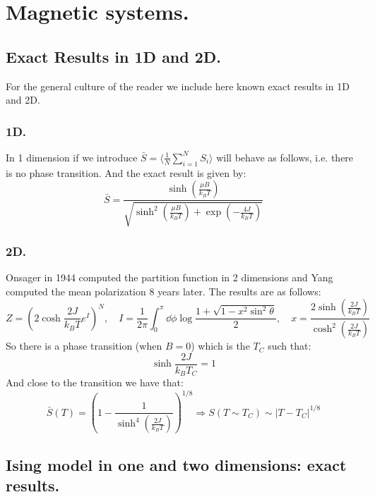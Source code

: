 \documentclass[10pt,a4paper]{book}
\begin{document}
\section{Magnetic systems.}
\subsection{Exact Results in 1D and 2D.}
For the general culture of the reader we include here known exact results in 1D and 2D. 
\subsubsection{1D.}
In 1 dimension if we introduce $\bar{S} = \langle \frac{1}{N} \sum_{i = 1}^N S_i \rangle$ will behave as follows, i.e. there is no phase transition. And the exact result is given by:
\[
\bar{S}  = \frac{\sinh(\frac{\mu B}{k_B T})}{\sqrt{\sinh^2(\frac{\mu B}{k_B T}) + \exp(-\frac{4J}{k_B T})}}
\]

\subsubsection{2D.}
Onsager in 1944 computed the partition function in 2 dimensions and Yang computed the mean polarization 8 years later. The results are as follows:
\[
Z = \left(2 \cosh \frac{2 J}{k_B T} e^I \right)^N,\quad I = \frac{1}{2\pi} \int_0^\pi \dd \phi \log \frac{1 + \sqrt{1 - x^2 \sin^2 \theta}}{2}, \quad x = \frac{2 \sinh (\frac{2J}{k_B T})}{\cosh^2(\frac{2J}{k_B T})}
\]
So there is a phase transition (when $B = 0$) which is the $T_C$ such that:
\[
\sinh \frac{2J}{k_B T_C} = 1
\]
And close to the transition we have that:
\[
\bar{S}(T) = \left(1 - \frac{1}{\sinh^4(\frac{2J}{k_B T})}\right)^{1/8} \Rightarrow S(T \sim T_C) \sim |T - T_C|^{1/8}
\]

\subsection{Ising model in one and two dimensions: exact results.}
\end{document}

